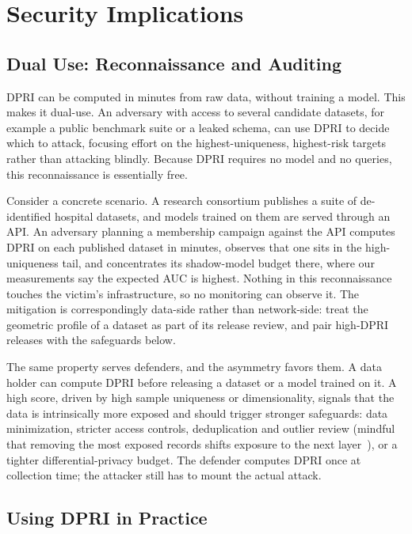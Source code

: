 \section{Security Implications}
\label{sec:implications}

\subsection{Dual Use: Reconnaissance and Auditing}

DPRI can be computed in minutes from raw data, without training a model.
This makes it dual-use. An adversary with access to several candidate
datasets, for example a public benchmark suite or a leaked schema, can use
DPRI to decide which to attack, focusing effort on the highest-uniqueness,
highest-risk targets rather than attacking blindly. Because DPRI requires no
model and no queries, this reconnaissance is essentially free.

Consider a concrete scenario. A research consortium publishes a suite of
de-identified hospital datasets, and models trained on them are served
through an API. An adversary planning a membership campaign against the
API computes DPRI on each published dataset in minutes, observes that
one sits in the high-uniqueness tail, and concentrates its shadow-model
budget there, where our measurements say the expected AUC is highest.
Nothing in this reconnaissance touches the victim's infrastructure, so
no monitoring can observe it. The mitigation is correspondingly
data-side rather than network-side: treat the geometric profile of a
dataset as part of its release review, and pair high-DPRI releases with
the safeguards below.

The same property serves defenders, and the asymmetry favors them. A
data holder can compute DPRI before releasing a dataset or a model
trained on it. A high score, driven by high sample uniqueness or
dimensionality, signals that the data is intrinsically more exposed and
should trigger stronger safeguards: data minimization, stricter access
controls, deduplication and outlier review (mindful that removing the
most exposed records shifts exposure to the next
layer~\cite{carlini2022onion}), or a tighter differential-privacy
budget. The defender computes DPRI once at collection time; the
attacker still has to mount the actual attack.

\subsection{Using DPRI in Practice}

